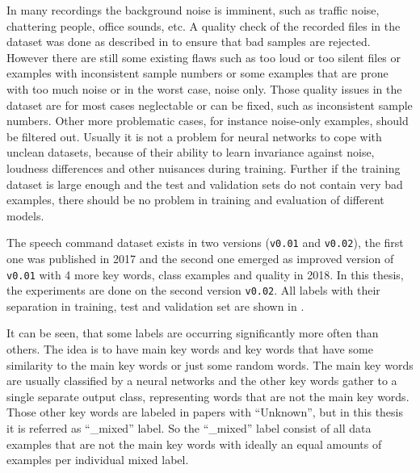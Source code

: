 In many recordings the background noise is imminent, such as traffic noise, chattering people, office sounds, etc.
A quality check of the recorded files in the dataset was done as described in \cite{Warden2018} to ensure that bad samples are rejected.
However there are still some existing flaws such as too loud or too silent files or examples with inconsistent sample numbers or some examples that are prone with too much noise or in the worst case, noise only.
Those quality issues in the dataset are for most cases neglectable or can be fixed, such as inconsistent sample numbers. 
Other more problematic cases, for instance noise-only examples, should be filtered out.
Usually it is not a problem for neural networks to cope with unclean datasets, because of their ability to learn invariance against noise, loudness differences and other nuisances during training.
Further if the training dataset is large enough and the test and validation sets do not contain very bad examples, there should be no problem in training and evaluation of different models.

The speech command dataset exists in two versions (\texttt{v0.01} and \texttt{v0.02}), the first one was published in 2017 and the second one emerged as improved version of \texttt{v0.01} with 4 more key words, class examples and quality in 2018.
In this thesis, the experiments are done on the second version \texttt{v0.02}.
All labels with their separation in training, test and validation set are shown in .


It can be seen, that some labels are occurring significantly more often than others.
The idea is to have main key words and key words that have some similarity to the main key words or just some random words.
The main key words are usually classified by a neural networks and the other key words gather to a single separate output class, representing words that are not the main key words.
Those other key words are labeled in papers with \enquote{Unknown}, but in this thesis it is referred as \enquote{\_mixed} label.
So the \enquote{\_mixed} label consist of all data examples that are not the main key words with ideally an equal amounts of examples per individual mixed label. 

